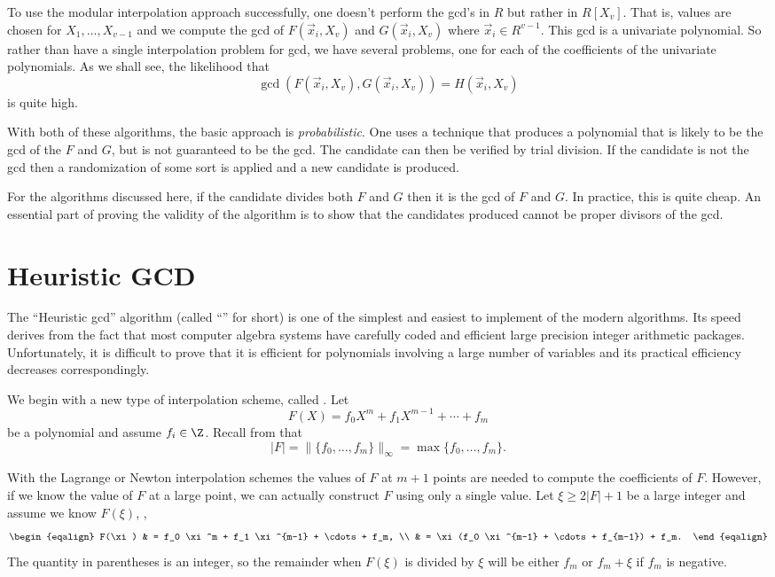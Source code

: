 To use the modular interpolation approach successfully, one
doesn't perform the {\sc gcd}'s in $R$ but rather in $R[X_v]$.  That is,
values are chosen for $X_1, \ldots, X_{v-1}$ and we compute the {\sc gcd} of
$F(\vec{x}_i, X_v)$ and $G(\vec{x}_i, X_v)$ where $\vec{x}_i \in
R^{v-1}$.  This {\sc gcd} is a univariate polynomial.  So rather than have a
single interpolation problem for {\sc gcd}, we have several problems, one
for each of the coefficients of the univariate polynomials.  As we
shall see, the likelihood that
\[
\gcd(F(\vec{x}_i, X_v), G(\vec{x}_i, X_v)) = H(\vec{x}_i, X_v)
\]
is quite high.

With both of these algorithms, the basic approach is {\em
probabilistic\/}.  One uses a technique that produces a polynomial
that is likely to be the {\sc gcd} of the $F$ and $G$, but is not guaranteed
to be the {\sc gcd}.  The candidate can then be verified by trial division.
If the candidate is not the {\sc gcd} then a randomization of some sort is
applied and a new candidate is produced.

For the algorithms discussed here, if the candidate divides both $F$
and $G$ then it is the {\sc gcd} of $F$ and $G$.  In practice, this
 is quite cheap.  An essential part of proving the
validity of the algorithm is to show that the candidates produced
cannot be proper divisors of the {\sc gcd}.

\section{Heuristic GCD}
\label{PGCD:Heuristic:Sec}

The ``Heuristic {\sc gcd}'' algorithm (called ``'' for short) is
one of the simplest and easiest to implement of the modern algorithms.
Its speed derives from the fact that most computer algebra systems
have carefully coded and efficient large precision integer arithmetic
packages.  Unfortunately, it is difficult to prove that it is
efficient for polynomials involving a large number of variables and
its practical efficiency decreases correspondingly.

We begin with a new type of interpolation scheme, called .  Let 
\[
F(X) = f_0 X^m + f_1 X^{m-1} + \cdots + f_m
\]
be a polynomial and assume $f_i \in \Z$.  Recall from
 that
\[
|F| = \| \{ f_0, \ldots, f_m \} \|_{\infty} 
  = \max \{ f_0, \ldots, f_m \}.
\]

With the Lagrange or Newton interpolation schemes the values of $F$ at
$m+1$ points are needed to compute the coefficients of $F$.  However,
if we know the value of $F$ at a large point, we can actually
construct $F$ using only a single value.  Let $\xi \ge 2 |F| + 1$ be a
large integer and assume we know $F(\xi)$, \ie,
\[
\begin {eqalign}
  F(\xi) & = f_0 \xi^m + f_1 \xi^{m-1} + \cdots + f_m, \\
      & = \xi (f_0 \xi^{m-1} + \cdots + f_{m-1}) + f_m.
\end{eqalign}
\]
The quantity in parentheses is an integer, so the remainder when
$F(\xi)$ is divided by $\xi$ will be either $f_m$ or $f_m + \xi$ if
$f_m$ is negative.  

